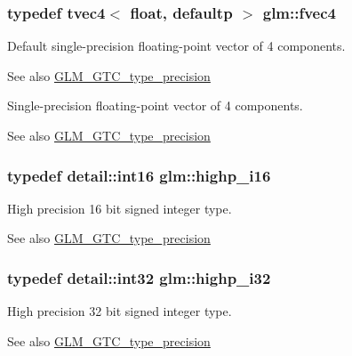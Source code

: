 \subsubsection[{fvec4}]{\setlength{\rightskip}{0pt plus 5cm}typedef tvec4$<$ float, defaultp $>$ {\bf glm\+::fvec4}}\label{group__gtc__type__precision_ga396c4084cd7e5465f8b56035e0420c3e}
Default single-\/precision floating-\/point vector of 4 components. \begin{DoxySeeAlso}{See also}
\hyperlink{group__gtc__type__precision}{G\+L\+M\+\_\+\+G\+T\+C\+\_\+type\+\_\+precision}
\end{DoxySeeAlso}
Single-\/precision floating-\/point vector of 4 components. \begin{DoxySeeAlso}{See also}
\hyperlink{group__gtc__type__precision}{G\+L\+M\+\_\+\+G\+T\+C\+\_\+type\+\_\+precision} 
\end{DoxySeeAlso}
\hypertarget{group__gtc__type__precision_gaa04399853952dbce29cb62e2432f350a}{}
\subsubsection[{highp\+\_\+i16}]{\setlength{\rightskip}{0pt plus 5cm}typedef {\bf detail\+::int16} {\bf glm\+::highp\+\_\+i16}}\label{group__gtc__type__precision_gaa04399853952dbce29cb62e2432f350a}
High precision 16 bit signed integer type. \begin{DoxySeeAlso}{See also}
\hyperlink{group__gtc__type__precision}{G\+L\+M\+\_\+\+G\+T\+C\+\_\+type\+\_\+precision} 
\end{DoxySeeAlso}
\hypertarget{group__gtc__type__precision_ga197d19b585222da57d70238a5cfc2be8}{}
\subsubsection[{highp\+\_\+i32}]{\setlength{\rightskip}{0pt plus 5cm}typedef {\bf detail\+::int32} {\bf glm\+::highp\+\_\+i32}}\label{group__gtc__type__precision_ga197d19b585222da57d70238a5cfc2be8}
High precision 32 bit signed integer type. \begin{DoxySeeAlso}{See also}
\hyperlink{group__gtc__type__precision}{G\+L\+M\+\_\+\+G\+T\+C\+\_\+type\+\_\+precision} 
\end{DoxySeeAlso}
\hypertarget{group__gtc__type__precision_gad3cb9a0ac0266ea2c51c6fac256345d1}{}
